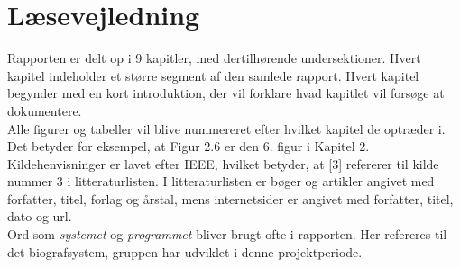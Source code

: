 \newpage
\section*{Læsevejledning}
Rapporten er delt op i 9 kapitler, med dertilhørende undersektioner. Hvert kapitel indeholder et større segment af den samlede rapport.
Hvert kapitel begynder med en kort introduktion, der vil forklare hvad kapitlet vil forsøge at dokumentere.\\ 

Alle figurer og tabeller vil blive nummereret efter hvilket kapitel de optræder i. Det betyder for eksempel, at Figur 2.6 er den 
6. figur i Kapitel 2. \\

Kildehenvisninger er lavet efter IEEE, hvilket betyder, at [3] refererer til kilde nummer 3 i litteraturlisten. 
I litteraturlisten er bøger og artikler angivet med forfatter, titel, forlag og årstal, mens internetsider er angivet med forfatter, titel, dato og url. \\ 

Ord som \textit{systemet} og \textit{programmet} bliver brugt ofte i rapporten. Her refereres til det biografsystem, gruppen har udviklet i denne projektperiode.